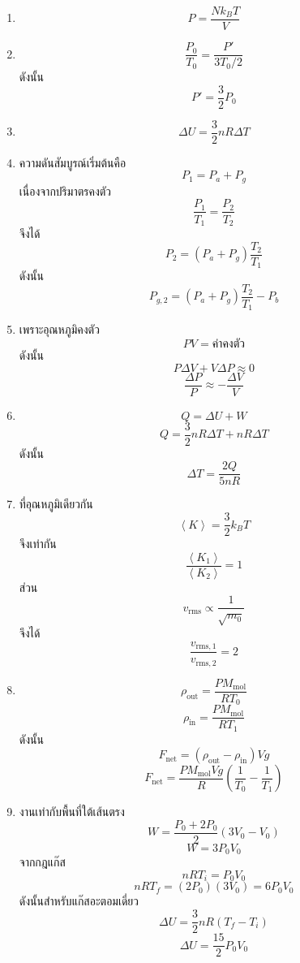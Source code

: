 \begin{enumerate}
    \item
    \[
    \boxed{P=\frac{Nk_BT}{V}}
    \]

    \item
    \[
    \frac{P_0}{T_0}
    =
    \frac{P'}{3T_0/2}
    \]
    ดังนั้น
    \[
    \boxed{P'=\frac{3}{2}P_0}
    \]

    \item
    \[
    \boxed{\Delta U=\frac{3}{2}nR\Delta T}
    \]

    \item ความดันสัมบูรณ์เริ่มต้นคือ
    \[
    P_1=P_a+P_g
    \]
    เนื่องจากปริมาตรคงตัว
    \[
    \frac{P_1}{T_1}
    =
    \frac{P_2}{T_2}
    \]
    จึงได้
    \[
    P_2=(P_a+P_g)\frac{T_2}{T_1}
    \]
    ดังนั้น
    \[
    \boxed{
    P_{g,2}
    =
    (P_a+P_g)\frac{T_2}{T_1}-P_b
    }
    \]

    \item เพราะอุณหภูมิคงตัว
    \[
    PV=\text{ค่าคงตัว}
    \]
    ดังนั้น
    \[
    P\Delta V+V\Delta P\approx0
    \]
    \[
    \boxed{
    \frac{\Delta P}{P}
    \approx
    -\frac{\Delta V}{V}
    }
    \]

    \item
    \[
    Q
    =
    \Delta U+W
    \]
    \[
    Q
    =
    \frac{3}{2}nR\Delta T+nR\Delta T
    \]
    ดังนั้น
    \[
    \boxed{
    \Delta T
    =
    \frac{2Q}{5nR}
    }
    \]

    \item ที่อุณหภูมิเดียวกัน
    \[
    \left\langle K\right\rangle
    =
    \frac{3}{2}k_BT
    \]
    จึงเท่ากัน
    \[
    \boxed{
    \frac{\left\langle K_1\right\rangle}
    {\left\langle K_2\right\rangle}=1
    }
    \]
    ส่วน
    \[
    v_{\text{rms}}
    \propto
    \frac{1}{\sqrt{m_0}}
    \]
    จึงได้
    \[
    \boxed{
    \frac{v_{\text{rms},1}}
    {v_{\text{rms},2}}=2
    }
    \]

    \item
    \[
    \rho_{\text{out}}
    =
    \frac{PM_{\text{mol}}}{RT_0}
    \]
    \[
    \rho_{\text{in}}
    =
    \frac{PM_{\text{mol}}}{RT_1}
    \]
    ดังนั้น
    \[
    F_{\text{net}}
    =
    (\rho_{\text{out}}-\rho_{\text{in}})Vg
    \]
    \[
    \boxed{
    F_{\text{net}}
    =
    \frac{PM_{\text{mol}}Vg}{R}
    \left(
    \frac{1}{T_0}-\frac{1}{T_1}
    \right)
    }
    \]

    \item งานเท่ากับพื้นที่ใต้เส้นตรง
    \[
    W
    =
    \frac{P_0+2P_0}{2}(3V_0-V_0)
    \]
    \[
    \boxed{W=3P_0V_0}
    \]
    จากกฎแก๊ส
    \[
    nRT_i=P_0V_0
    \]
    \[
    nRT_f=(2P_0)(3V_0)=6P_0V_0
    \]
    ดังนั้นสำหรับแก๊สอะตอมเดี่ยว
    \[
    \Delta U
    =
    \frac{3}{2}nR(T_f-T_i)
    \]
    \[
    \boxed{
    \Delta U
    =
    \frac{15}{2}P_0V_0
    }
    \]


\end{enumerate}
